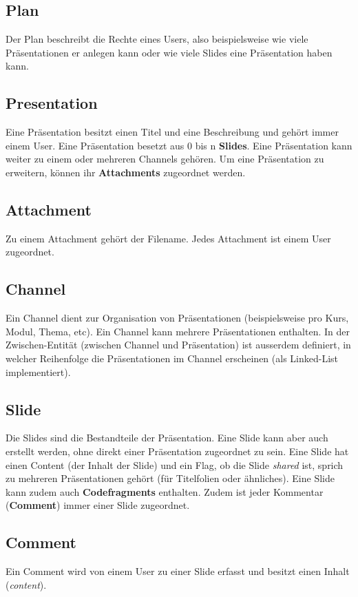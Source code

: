 \subsection{Plan}
Der Plan beschreibt die Rechte eines Users, also beispielsweise wie viele Präsentationen er anlegen kann oder wie viele Slides eine Präsentation haben kann.

\subsection{Presentation}
Eine Präsentation besitzt einen Titel und eine Beschreibung und gehört immer einem User. Eine Präsentation besetzt aus 0 bis n \textbf{Slides}. Eine Präsentation kann weiter zu einem oder mehreren Channels gehören. Um eine Präsentation zu erweitern, können ihr \textbf{Attachments} zugeordnet werden.

\subsection{Attachment}
Zu einem Attachment gehört der Filename. Jedes Attachment ist einem User zugeordnet.


\subsection{Channel}
Ein Channel dient zur Organisation von Präsentationen (beispielsweise pro Kurs, Modul, Thema, etc). Ein Channel kann mehrere Präsentationen enthalten. In der Zwischen-Entität (zwischen Channel und Präsentation) ist ausserdem definiert, in welcher Reihenfolge die Präsentationen im Channel erscheinen (als Linked-List implementiert).

\subsection{Slide}
Die Slides sind die Bestandteile der Präsentation. Eine Slide kann aber auch erstellt werden, ohne direkt einer Präsentation zugeordnet zu sein. Eine Slide hat einen Content (der Inhalt der Slide) und ein Flag, ob die Slide \emph{shared} ist, sprich zu mehreren Präsentationen gehört (für Titelfolien oder ähnliches). Eine Slide kann zudem auch \textbf{Codefragments} enthalten. Zudem ist jeder Kommentar (\textbf{Comment}) immer einer Slide zugeordnet.

\subsection{Comment}
Ein Comment wird von einem User zu einer Slide erfasst und besitzt einen Inhalt (\emph{content}).


